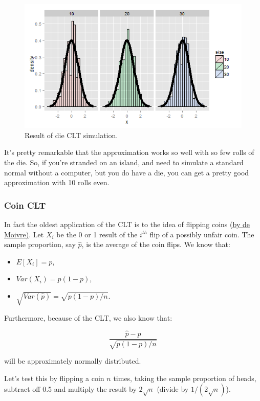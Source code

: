 \documentclass[]{article}
\begin{document}
\begin{figure}[htbp]
\centering
\includegraphics{LeanPub/images/dieCLT-1.png}
\caption{Result of die CLT simulation.}
\end{figure}

It's pretty remarkable that the approximation works so well with so few
rolls of the die. So, if you're stranded on an island, and need to
simulate a standard normal without a computer, but you do have a die,
you can get a pretty good approximation with 10 rolls even.

\subsubsection{Coin CLT}\label{coin-clt}

In fact the oldest application of the CLT is to the idea of flipping
coins
\href{http://en.wikipedia.org/wiki/De_Moivre\%E2\%80\%93Laplace_theorem}{(by
de Moivre)}. Let $X_i$ be the 0 or 1 result of the $i^{th}$ flip of a
possibly unfair coin. The sample proportion, say $\hat p$, is the
average of the coin flips. We know that:

\begin{itemize}
\itemsep1pt\parskip0pt
\item
  $E[X_i] = p$,
\item
  $Var(X_i) = p(1-p)$,
\item
  $\sqrt{Var(\hat p)} = \sqrt{p(1-p)/n}$.
\end{itemize}

Furthermore, because of the CLT, we also know that:

\[
\frac{\hat p - p}{\sqrt{p(1-p)/n}}
\]

will be approximately normally distributed.

Let's test this by flipping a coin $n$ times, taking the sample
proportion of heads, subtract off 0.5 and multiply the result by
$2 \sqrt{n}$ (divide by $1/(2 \sqrt{n})$).
\end{document}
